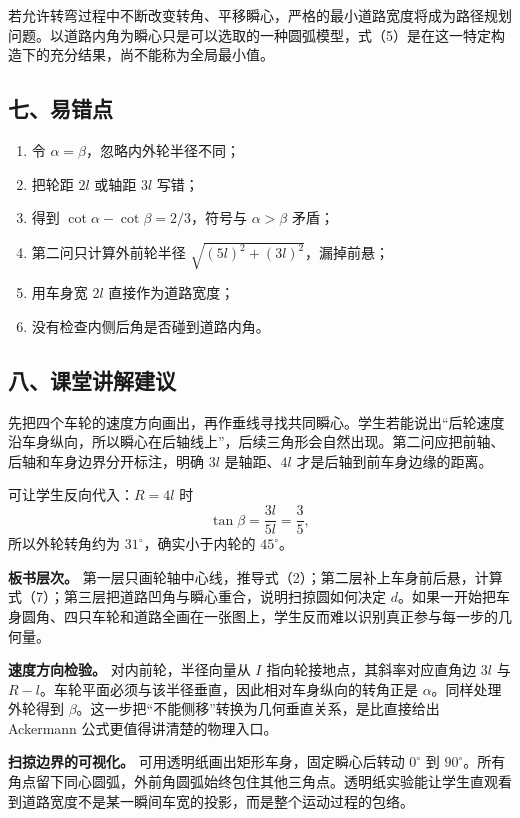 \documentclass[12pt,a4paper,UTF8]{ctexart}
\newcommand{\tightlist}{\setlength{\itemsep}{0pt}\setlength{\parskip}{0pt}}
\begin{document}
若允许转弯过程中不断改变转角、平移瞬心，严格的最小道路宽度将成为路径规划问题。以道路内角为瞬心只是可以选取的一种圆弧模型，式（5）是在这一特定构造下的充分结果，尚不能称为全局最小值。

\subsection{七、易错点}\label{ux4e03ux6613ux9519ux70b9}

\begin{enumerate}
\def\labelenumi{\arabic{enumi}.}
\tightlist
\item
  令 \(\alpha=\beta\)，忽略内外轮半径不同；
\item
  把轮距 \(2l\) 或轴距 \(3l\) 写错；
\item
  得到 \(\cot\alpha-\cot\beta=2/3\)，符号与 \(\alpha>\beta\) 矛盾；
\item
  第二问只计算外前轮半径 \(\sqrt{(5l)^2+(3l)^2}\)，漏掉前悬；
\item
  用车身宽 \(2l\) 直接作为道路宽度；
\item
  没有检查内侧后角是否碰到道路内角。
\end{enumerate}

\subsection{八、课堂讲解建议}\label{ux516bux8bfeux5802ux8bb2ux89e3ux5efaux8bae}

先把四个车轮的速度方向画出，再作垂线寻找共同瞬心。学生若能说出``后轮速度沿车身纵向，所以瞬心在后轴线上''，后续三角形会自然出现。第二问应把前轴、后轴和车身边界分开标注，明确
\(3l\) 是轴距、\(4l\) 才是后轴到前车身边缘的距离。

可让学生反向代入：\(R=4l\) 时 \[
\tan\beta=\frac{3l}{5l}=\frac35,
\] 所以外轮转角约为 \(31^\circ\)，确实小于内轮的 \(45^\circ\)。

\textbf{板书层次。}
第一层只画轮轴中心线，推导式（2）；第二层补上车身前后悬，计算式（7）；第三层把道路凹角与瞬心重合，说明扫掠圆如何决定
\(d\)。如果一开始把车身圆角、四只车轮和道路全画在一张图上，学生反而难以识别真正参与每一步的几何量。

\textbf{速度方向检验。} 对内前轮，半径向量从 \(I\)
指向轮接地点，其斜率对应直角边 \(3l\) 与
\(R-l\)。车轮平面必须与该半径垂直，因此相对车身纵向的转角正是
\(\alpha\)。同样处理外轮得到
\(\beta\)。这一步把``不能侧移''转换为几何垂直关系，是比直接给出
Ackermann 公式更值得讲清楚的物理入口。

\textbf{扫掠边界的可视化。} 可用透明纸画出矩形车身，固定瞬心后转动
\(0^\circ\) 到
\(90^\circ\)。所有角点留下同心圆弧，外前角圆弧始终包住其他三角点。透明纸实验能让学生直观看到道路宽度不是某一瞬间车宽的投影，而是整个运动过程的包络。
\end{document}
